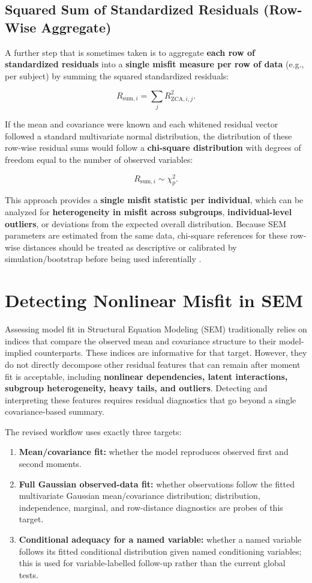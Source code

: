 \documentclass[floatsintext,a4paper]{apa7} %
\begin{document}
	\subsection{Squared Sum of Standardized Residuals (Row-Wise Aggregate)}
	A further step that is sometimes taken is to aggregate \textbf{each row of standardized residuals} into a \textbf{single misfit measure per row of data} (e.g., per subject) by summing the squared standardized residuals:
	
	$$
R_{\text{sum}, i} = \sum_j R_{\text{ZCA}, i, j}^2.
	$$
	
	If the mean and covariance were known and each whitened residual vector followed a standard multivariate normal distribution, the distribution of these row-wise residual sums would follow a \textbf{chi-square distribution} with degrees of freedom equal to the number of observed variables:
	
	$$
	R_{\text{sum}, i} \sim \chi^2_p.
	$$
	
	This approach provides a \textbf{single misfit statistic per individual}, which can be analyzed for \textbf{heterogeneity in misfit across subgroups}, \textbf{individual-level outliers}, or deviations from the expected overall distribution. Because SEM parameters are estimated from the same data, chi-square references for these row-wise distances should be treated as descriptive or calibrated by simulation/bootstrap before being used inferentially \citep{bollen1992bootstrapping}.
	
	
	\section{Detecting Nonlinear Misfit in SEM}
	
	Assessing model fit in Structural Equation Modeling (SEM) traditionally relies on indices that compare the observed mean and covariance structure to their model-implied counterparts. These indices are informative for that target. However, they do not directly decompose other residual features that can remain after moment fit is acceptable, including \textbf{nonlinear dependencies, latent interactions, subgroup heterogeneity, heavy tails, and outliers}. Detecting and interpreting these features requires residual diagnostics that go beyond a single covariance-based summary.
	
The revised workflow uses exactly three targets:
\begin{enumerate}
\item \textbf{Mean/covariance fit:} whether the model reproduces observed first and second moments.
\item \textbf{Full Gaussian observed-data fit:} whether observations follow the fitted multivariate Gaussian mean/covariance distribution; distribution, independence, marginal, and row-distance diagnostics are probes of this target.
\item \textbf{Conditional adequacy for a named variable:} whether a named variable follows its fitted conditional distribution given named conditioning variables; this is used for variable-labelled follow-up rather than the current global tests.
\end{enumerate}
	
\end{document}
